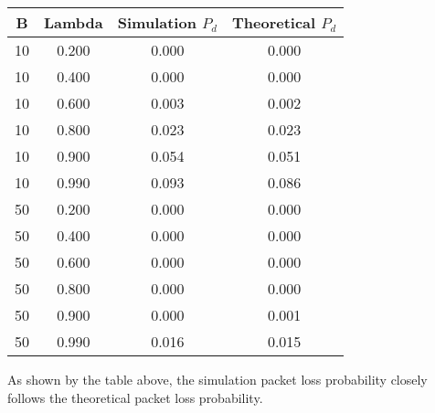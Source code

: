 \documentclass{article}
\begin{document}
\section{}
\begin{center}
\begin{tabular}{c | c | c | c}
    B   & Lambda  & Simulation $P_d$    & Theoretical $P_d$ \\
    \hline
    10  & 0.200   & 0.000   & 0.000 \\
    10  & 0.400   & 0.000   & 0.000 \\
    10  & 0.600   & 0.003   & 0.002 \\ 
    10  & 0.800   & 0.023   & 0.023 \\
    10  & 0.900   & 0.054   & 0.051 \\
    10  & 0.990   & 0.093   & 0.086 \\
    50  & 0.200   & 0.000   & 0.000 \\
    50  & 0.400   & 0.000   & 0.000 \\
    50  & 0.600   & 0.000   & 0.000 \\
    50  & 0.800   & 0.000   & 0.000 \\
    50  & 0.900   & 0.000   & 0.001 \\
    50  & 0.990   & 0.016   & 0.015 \\
\end{tabular}
\end{center}
As shown by the table above, the simulation packet loss probability closely follows the theoretical packet loss probability.

\part{}	
\end{document}
